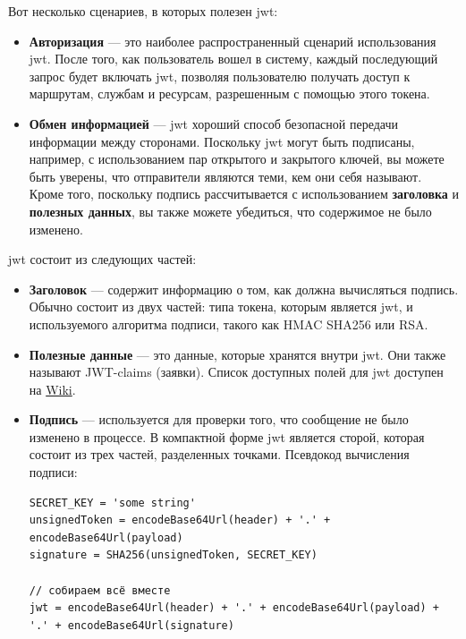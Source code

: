 Вот несколько сценариев, в которых полезен \acrshort{jwt}:
\begin{itemize}
    \item \textbf{Авторизация} --- это наиболее распространенный сценарий использования \acrshort{jwt}. После того, как пользователь вошел в систему, каждый последующий запрос будет включать \acrshort{jwt}, позволяя пользователю получать доступ к маршрутам, службам и ресурсам, разрешенным с помощью этого токена.
    \item \textbf{Обмен информацией} --- \acrshort{jwt} хороший способ безопасной передачи информации между сторонами. Поскольку \acrshort{jwt} могут быть подписаны, например, с использованием пар открытого и закрытого ключей, вы можете быть уверены, что отправители являются теми, кем они себя называют. Кроме того, поскольку подпись рассчитывается с использованием \textbf{заголовка} и \textbf{полезных данных}, вы также можете убедиться, что содержимое не было изменено.
\end{itemize}

\acrshort{jwt} состоит из следующих частей:
\begin{itemize}
    \item \textbf{Заголовок} ---  содержит информацию о том, как должна вычисляться подпись. Обычно состоит из двух частей: типа токена, которым является \acrshort{jwt}, и используемого алгоритма подписи, такого как HMAC SHA256 или RSA.
    \item \textbf{Полезные данные} --- это данные, которые хранятся внутри \acrshort{jwt}. Они также называют JWT-claims (заявки). Список доступных полей для \acrshort{jwt} доступен на \href{https://en.wikipedia.org/wiki/JSON_Web_Token#Standard_fields}{Wiki}.
    \item \textbf{Подпись} --- используется для проверки того, что сообщение не было изменено в процессе. В компактной форме \acrshort{jwt} является сторой, которая состоит из трех частей, разделенных точками. Псевдокод вычисления подписи:
    \begin{noerr}
    \begin{verbatim}
SECRET_KEY = 'some string'
unsignedToken = encodeBase64Url(header) + '.' + encodeBase64Url(payload)
signature = SHA256(unsignedToken, SECRET_KEY)

// собираем всё вместе
jwt = encodeBase64Url(header) + '.' + encodeBase64Url(payload) + '.' + encodeBase64Url(signature)
    \end{verbatim}
    \end{noerr}
\end{itemize}


\clearpage